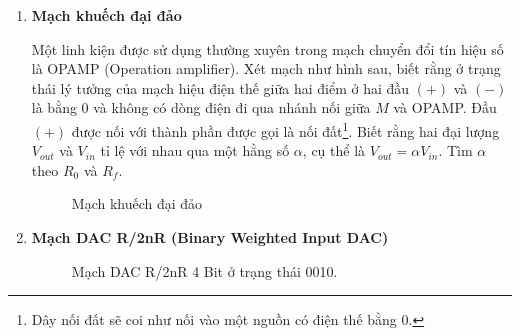 \begin{center}
\begin{enumerate}[label=(\alph*)]
    \item\textbf{Mạch khuếch đại đảo}
    
    Một linh kiện được sử dụng thường xuyên trong mạch chuyển đổi tín hiệu số là OPAMP (Operation amplifier). Xét mạch như hình sau, biết rằng ở trạng thái lý tưởng của mạch hiệu điện thế giữa hai điểm ở hai đầu $(+)$ và $(-)$ là bằng $0$ và không có dòng điện đi qua nhánh nối giữa $M$ và OPAMP. Đầu $(+)$ được nối với thành phần được gọi là nối đất\footnote{Dây nối đất sẽ coi như nối vào một nguồn có điện thế bằng 0. }. Biết rằng hai đại lượng $V_{out}$ và $V_{in}$ tỉ lệ với nhau qua một hằng số $\alpha$, cụ thể là $V_{out} = \alpha V_{in}$. Tìm $\alpha$ theo $R_0$ và $R_f$.
    \begin{figure}[H]
        \centering
        \caption{Mạch khuếch đại đảo}
        \label{fig:60}
    \end{figure}        
    

    
    \item \textbf{Mạch DAC R/2nR (Binary Weighted Input DAC)}
    \begin{figure}[H]
         
         \caption{Mạch DAC R/2nR 4 Bit ở trạng thái 0010.}
         \label{fig:61}
    \end{figure}


\end{enumerate}
\end{center}
